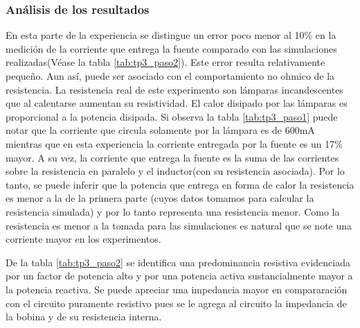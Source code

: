 \subsubsection{Análisis de los resultados}
En esta parte de la experiencia se distingue un error poco menor al 10\% en la medición de la corriente que entrega la fuente comparado con las simulaciones realizadas(Véase la tabla \ref{tab:tp3_paso2}). Este error resulta relativamente pequeño. Aun así, puede ser asociado con el comportamiento no ohmico de la resistencia. La resistencia real de este experimento son lámparas incandescentes que al calentarse aumentan su resistividad. El calor disipado por las lámparas es proporcional a la potencia disipada. Si observa la tabla \ref{tab:tp3_paso1} puede notar que la corriente que circula solamente por la lámpara es de 600mA mientras que en esta experiencia la corriente entregada por la fuente es un 17\% mayor. A su vez, la corriente que entrega la fuente es la suma de las corrientes sobre la resistencia en paralelo y el inductor(con su resistencia asociada). Por lo tanto, se puede inferir que la potencia que entrega en forma de calor la resistencia es menor a la de la primera parte (cuyos datos tomamos para calcular la resistencia simulada) y por lo tanto representa una resistencia menor. Como la resistencia es menor a la tomada para las simulaciones es natural que se note una corriente mayor en los experimentos.

De la tabla \ref{tab:tp3_paso2} se identifica una predominancia resistiva evidenciada por un factor de potencia alto y por una potencia activa sustancialmente mayor a la potencia reactiva. Se puede apreciar una impedancia mayor en compararación con el circuito puramente resistivo pues se le agrega al circuito la impedancia de la bobina y de su resistencia interna. 


